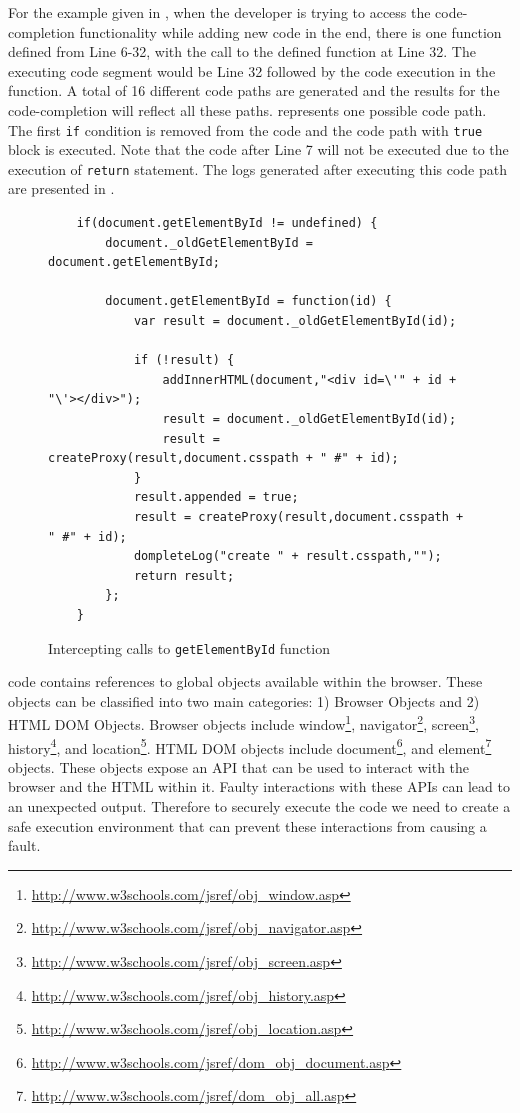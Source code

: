 		For the example given in , when the developer is trying to access the code-completion functionality while adding new code in the end, there is one function defined from Line 6-32, with the call to the defined function at Line 32. The executing code segment would be Line 32 followed by the code execution in the function. A total of 16 different code paths are generated and the results for the code-completion will reflect all these paths.  represents one possible code path. The first \texttt{if} condition is removed from the code and the code path with \texttt{true} block is executed. Note that the code after Line 7 will not be executed due to the execution of \texttt{return} statement. The logs generated after executing this code path are presented in .	
		
		
				
			\begin{figure}
			\medskip
			\begin{lstlisting}
	if(document.getElementById != undefined) { 
		document._oldGetElementById = document.getElementById; 
			
		document.getElementById = function(id) { 
			var result = document._oldGetElementById(id); 
				
			if (!result) { 
				addInnerHTML(document,"<div id=\'" + id + "\'></div>"); 
				result = document._oldGetElementById(id); 
				result = createProxy(result,document.csspath + " #" + id); 
			} 
			result.appended = true;
			result = createProxy(result,document.csspath + " #" + id);
			dompleteLog("create " + result.csspath,"");
			return result; 
		}; 
	}
			\end{lstlisting}
			\caption{Intercepting calls to \texttt{getElementById} function}
			\label{Fig:Environment}
			\end{figure}
			
		
			\javascript code contains references to global objects available within the browser. These objects can be classified into two main categories: 1) Browser Objects and 2) HTML DOM Objects. Browser objects include window\footnote{\url{http://www.w3schools.com/jsref/obj_window.asp}}, navigator\footnote{\url{http://www.w3schools.com/jsref/obj_navigator.asp}}, screen\footnote{\url{http://www.w3schools.com/jsref/obj_screen.asp}}, history\footnote{\url{http://www.w3schools.com/jsref/obj_history.asp}},  and location\footnote{\url{http://www.w3schools.com/jsref/obj_location.asp}}. HTML DOM objects include document\footnote{\url{http://www.w3schools.com/jsref/dom_obj_document.asp}}, and element\footnote{\url{http://www.w3schools.com/jsref/dom_obj_all.asp}} objects. These objects expose an API that can be used to interact with the browser and the HTML within it. Faulty interactions with these APIs can lead to an unexpected output. Therefore to securely execute the code we need to create a safe execution environment that can prevent these interactions from causing a fault.
			
